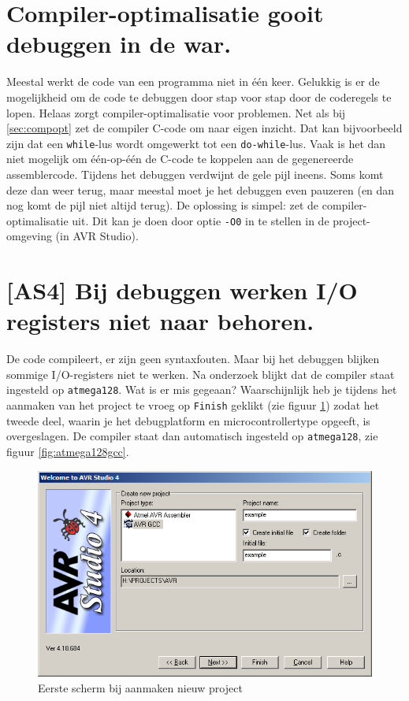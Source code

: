 \documentclass[12pt,a4paper,final,twoside,fleqn]{article}
\def\lstC{\lstinline[style=C]}
\begin{document}
\section{Compiler-optimalisatie gooit debuggen in de war.}
Meestal werkt de code van een programma niet in \'{e}\'{e}n keer. Gelukkig is
er de mogelijkheid om de code te debuggen door stap voor stap door de coderegels
te lopen. Helaas zorgt compiler-optimalisatie voor problemen. Net als
bij \ref{sec:compopt} zet de compiler C-code om naar eigen inzicht. Dat
kan bijvoorbeeld zijn dat een \lstC{while}-lus wordt omgewerkt tot een
\lstC{do-while}-lus. Vaak is het dan niet mogelijk om \'{e}\'{e}n-op-\'{e}\'{e}n
de C-code te koppelen aan de gegenereerde assemblercode. Tijdens het debuggen
verdwijnt de gele pijl ineens. Soms komt deze dan weer terug, maar meestal moet
je het debuggen even pauzeren (en dan nog komt de pijl niet altijd terug). De
oplossing is simpel: zet de compiler-optimalisatie uit. Dit kan je doen door
optie \lstC{-O0} in te stellen in de project-omgeving (in AVR Studio).


\section{[AS4] Bij debuggen werken I/O registers niet naar behoren.}
De code compileert, er zijn geen syntaxfouten. Maar bij het debuggen blijken
sommige I/O-registers niet te werken. Na onderzoek blijkt dat de compiler staat
ingesteld op \lstC{atmega128}. Wat is er mis gegeaan? Waarschijnlijk heb je
tijdens het aanmaken van het project te vroeg op \lstC{Finish} geklikt
(zie figuur \ref{fig:newproject1}) zodat het tweede deel, waarin je het
debugplatform en microcontrollertype opgeeft, is overgeslagen. De compiler
staat dan automatisch ingesteld op \lstC{atmega128}, zie figuur
\ref{fig:atmega128gcc}.

\begin{figure}[h!]
  \centering
  \includegraphics[scale=0.46]{newproject1}
  \caption{Eerste scherm bij aanmaken nieuw project}
  \label{fig:newproject1}
\end{figure}
\end{document}
